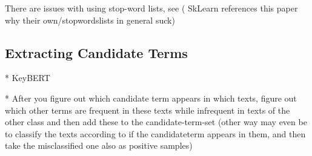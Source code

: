 There are issues with using stop-word lists, see \cite{nothman-etal-2018-stop} ( SkLearn references this paper why their own/stopwordslists in general suck)





\subsection{Extracting Candidate Terms}
\label{sec:extract_candidates}

* KeyBERT




* After you figure out which candidate term appears in which texts, figure out which other terms are frequent in these texts while infrequent in texts of the other class and then add these to the candidate-term-set (other way may even be to classify the texts according to if the candidateterm appears in them, and then take the misclassified one also as positive samples)

